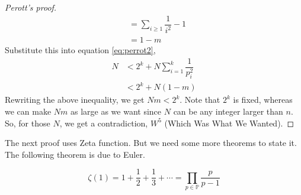 \begin{proof}[Perott's proof]
\begin{align*}
										 & = \sum_{i\geq 1}\dfrac 1{i^2} - 1\\
										 & = 1-m
			\end{align*}
		Substitute this into equation \eqref{eq:perrot2},
			\begin{align*}
					N		& < 2^k+N\sum_{i=1}^k\dfrac 1{p_i^2}\\
							& < 2^k+N(1-m)
			\end{align*}
		Rewriting the above inequality, we get $Nm  <  2^k$. Note that $2^k$ is fixed, whereas we can make $Nm$ as large as we want since $N$ can be any integer larger than $n$. So, for those $N$, we get a contradiction, $W^5$ (Which Was What We Wanted).
	\end{proof}
The next proof uses Zeta function. But we need some more theorems to state it. The following theorem is due to Euler.
	\begin{theorem}
		\[\zeta(1)=1+\dfrac{1}{2}+\dfrac{1}{3}+\cdots=\prod_{p\in\mathbb{P}}\dfrac{p}{p-1}\]\label{thm:zeta1}
	\end{theorem}

